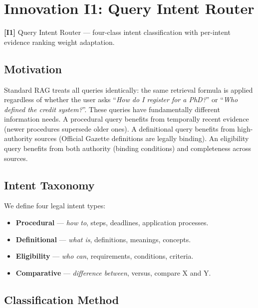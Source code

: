 \documentclass[12pt,a4paper]{article}
\newcommand{\innov}[2]{%
  \vspace{4pt}
  \noindent\colorbox{innovcolor!10}{\parbox{\dimexpr\linewidth-2\fboxsep}{%
    \small\textbf{\color{innovcolor}[I#1]} #2}}\vspace{4pt}}
\begin{document}
\section{Innovation I1: Query Intent Router}
\label{sec:intent}

\innov{1}{Query Intent Router — four-class intent classification with per-intent
evidence ranking weight adaptation.}

\subsection{Motivation}

Standard RAG treats all queries identically: the same retrieval formula is applied
regardless of whether the user asks ``\textit{How do I register for a PhD?}'' or
``\textit{Who defined the credit system?}''. These queries have fundamentally
different information needs. A procedural query benefits from temporally recent
evidence (newer procedures supersede older ones). A definitional query benefits
from high-authority sources (Official Gazette definitions are legally binding).
An eligibility query benefits from both authority (binding conditions) and
completeness across sources.

\subsection{Intent Taxonomy}

We define four legal intent types:
\begin{itemize}[leftmargin=*,nosep]
\item \textbf{Procedural} — \textit{how to}, steps, deadlines, application processes.
\item \textbf{Definitional} — \textit{what is}, definitions, meanings, concepts.
\item \textbf{Eligibility} — \textit{who can}, requirements, conditions, criteria.
\item \textbf{Comparative} — \textit{difference between}, versus, compare X and Y.
\end{itemize}

\subsection{Classification Method}
\end{document}
